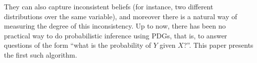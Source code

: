 \documentclass[twoside]{article}
\begin{document}
%
They can also capture inconsistent beliefs (for instance, two different distributions over the same variable), and moreover there is a natural way of measuring the degree of this inconsistency. 
%
Up to now,
there has been no practical way to do probabilistic inference using
PDGs, that is, to answer questions of the form
    ``what is the probability of $Y$ given $X$?''.
This paper presents the first such algorithm.
\end{document}
